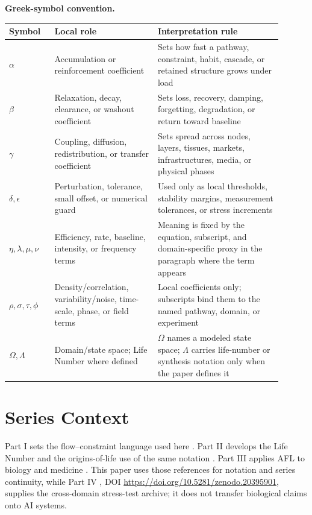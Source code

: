 \documentclass[12pt,a4paper]{article}
\begin{document}
\noindent\textbf{Greek-symbol convention.}
\begin{center}
{\small
\begin{tabular}{p{0.15\linewidth}p{0.34\linewidth}p{0.41\linewidth}}
\hline
Symbol & Local role & Interpretation rule \\
\hline
$\alpha$ & Accumulation or reinforcement coefficient & Sets how fast a pathway, constraint, habit, cascade, or retained structure grows under load \\
$\beta$ & Relaxation, decay, clearance, or washout coefficient & Sets loss, recovery, damping, forgetting, degradation, or return toward baseline \\
$\gamma$ & Coupling, diffusion, redistribution, or transfer coefficient & Sets spread across nodes, layers, tissues, markets, infrastructures, media, or physical phases \\
$\delta,\epsilon$ & Perturbation, tolerance, small offset, or numerical guard & Used only as local thresholds, stability margins, measurement tolerances, or stress increments \\
$\eta,\lambda,\mu,\nu$ & Efficiency, rate, baseline, intensity, or frequency terms & Meaning is fixed by the equation, subscript, and domain-specific proxy in the paragraph where the term appears \\
$\rho,\sigma,\tau,\phi$ & Density/correlation, variability/noise, time-scale, phase, or field terms & Local coefficients only; subscripts bind them to the named pathway, domain, or experiment \\
$\Omega,\Lambda$ & Domain/state space; Life Number where defined & $\Omega$ names a modeled state space; $\Lambda$ carries life-number or synthesis notation only when the paper defines it \\
\hline
\end{tabular}
}
\end{center}

\section{Series Context}

Part I sets the flow--constraint language used here \cite{MujjabiPartI2026}.
Part II develops the Life Number and the origins-of-life use of the same notation
\cite{MujjabiPartII2026}. Part III applies AFL to biology and medicine
\cite{MujjabiPartIII2026}. This paper uses those references for notation and
series continuity, while Part IV \cite{MujjabiPartIV2026}, DOI \url{https://doi.org/10.5281/zenodo.20395901}, supplies the
cross-domain stress-test archive; it does not transfer biological claims onto AI
systems.
\end{document}
